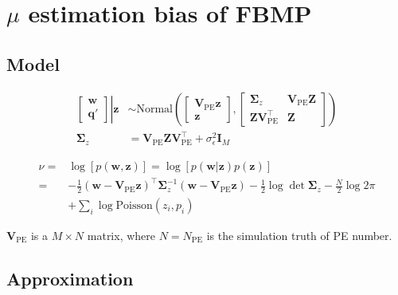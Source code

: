 \appendix
\section{$\mu$ estimation bias of FBMP}
\label{sec:mubias}

\subsection{Model}

\begin{equation}
\begin{aligned}
    \left.
    \begin{bmatrix}
        \bm{w} \\
        \bm{q}'
    \end{bmatrix}
    \right\vert\bm{z}
    &\sim \mathrm{Normal}\left(
    \begin{bmatrix}
        \bm{V}_\mathrm{PE}\bm{z} \\
        \bm{z}
    \end{bmatrix}, 
    \begin{bmatrix}
        \bm{\Sigma}_z & \bm{V}_\mathrm{PE}\bm{Z} \\
        \bm{Z}\bm{V}_\mathrm{PE}^\intercal & \bm{Z}
    \end{bmatrix}
    \right) \\
    \bm{\Sigma}_z &= \bm{V}_\mathrm{PE}\bm{Z}\bm{V}_\mathrm{PE}^\intercal+\sigma_\epsilon^2\bm{I}_M 
\end{aligned}
\end{equation}

\begin{equation}
\begin{aligned}
    \nu =& \log[p(\bm{w},\bm{z})] = \log[p(\bm{w}|\bm{z})p(\bm{z})] \\
    =& -\frac{1}{2}(\bm{w}-\bm{V}_\mathrm{PE}\bm{z})^\intercal\bm{\Sigma}_z^{-1}(\bm{w}-\bm{V}_\mathrm{PE}\bm{z})-\frac{1}{2}\log\det\bm{\Sigma}_z-\frac{N}{2}\log2\pi \\
    &+ \sum_{i}\log{\mathrm{Poisson}(z_i,p_i)}
\end{aligned}
\end{equation}

$\bm{V}_\mathrm{PE}$ is a $M\times N$ matrix, where $N=N_\mathrm{PE}$ is the simulation truth of PE number. 

\subsection{Approximation}

